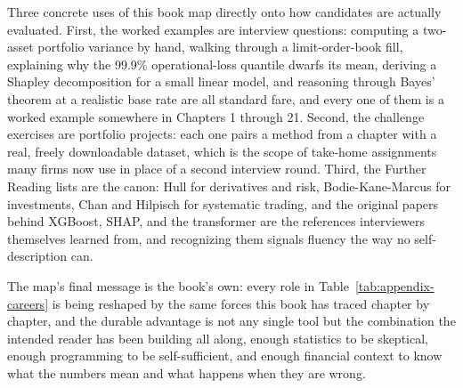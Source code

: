 \documentclass[../ai_in_finance]{subfiles}
\begin{document}
Three concrete uses of this book map directly onto how candidates are actually evaluated. First, the worked examples are interview questions: computing a two-asset portfolio variance by hand, walking through a limit-order-book fill, explaining why the 99.9\% operational-loss quantile dwarfs its mean, deriving a Shapley decomposition for a small linear model, and reasoning through Bayes' theorem at a realistic base rate are all standard fare, and every one of them is a worked example somewhere in Chapters 1 through 21. Second, the challenge exercises are portfolio projects: each one pairs a method from a chapter with a real, freely downloadable dataset, which is the scope of take-home assignments many firms now use in place of a second interview round. Third, the Further Reading lists are the canon: Hull for derivatives and risk, Bodie-Kane-Marcus for investments, Chan and Hilpisch for systematic trading, and the original papers behind XGBoost, SHAP, and the transformer are the references interviewers themselves learned from, and recognizing them signals fluency the way no self-description can.

The map's final message is the book's own: every role in Table~\ref{tab:appendix-careers} is being reshaped by the same forces this book has traced chapter by chapter, and the durable advantage is not any single tool but the combination the intended reader has been building all along, enough statistics to be skeptical, enough programming to be self-sufficient, and enough financial context to know what the numbers mean and what happens when they are wrong.
\end{document}
